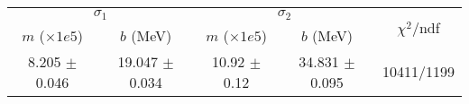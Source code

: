 \begin{tabular}{cc|cc||c}
\multicolumn{2}{c|}{$\sigma_1$} & \multicolumn{2}{|c}{$\sigma_2$} & \multirow{2}{*}{$\chi^2/$ndf} \\
$m$ ($\times1e5$) & $b$ (MeV) & $m$ ($\times1e5$) & $b$ (MeV) & \\
\hline
8.205 $\pm$ 0.046 & 19.047 $\pm$ 0.034 & 10.92 $\pm$ 0.12 & 34.831 $\pm$ 0.095 & 10411/1199\\
\end{tabular}
